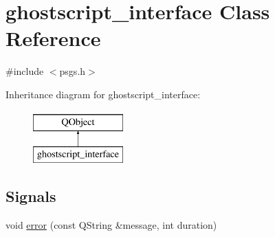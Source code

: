\hypertarget{classghostscript__interface}{\section{ghostscript\+\_\+interface Class Reference}
\label{classghostscript__interface}
}


{\ttfamily \#include $<$psgs.\+h$>$}

Inheritance diagram for ghostscript\+\_\+interface\+:\begin{figure}[H]
\begin{center}
\leavevmode
\includegraphics[height=2.000000cm]{classghostscript__interface}
\end{center}
\end{figure}
\subsection*{Signals}
\begin{DoxyCompactItemize}
\item 
void \hyperlink{classghostscript__interface_ae67f267e3aa962551a2872314978fed8}{error} (const Q\+String \&message, int duration)
\end{DoxyCompactItemize}
